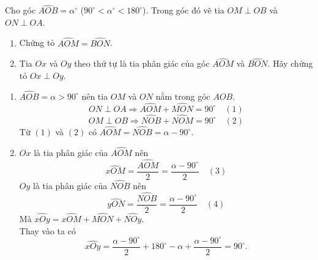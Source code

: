 \begin{bt}%
Cho góc $\widehat{AOB}=\alpha ^{\circ}$ ($90^{\circ}< \alpha^{\circ} <180^{\circ}$). Trong góc đó vẽ tia $OM \perp OB$ và $ON \perp OA$.
\begin{enumerate}
	\item Chứng tỏ $\widehat{AOM}=\widehat{BON}$.
	\item Tia $Ox$ và $Oy$ theo thứ tự là tia phân giác của góc $\widehat{AOM}$ và $\widehat{BON}$. Hãy chứng tỏ $Ox \perp Oy$.
\end{enumerate}
\loigiai
{ \begin{center}
	\end{center}
\begin{enumerate}
	\item $\widehat{AOB}=\alpha > 90^{\circ}$ nên tia $OM$ và $ON$ nằm trong góc $AOB$.\\
	$$ ON\perp OA \Rightarrow \widehat{AOM}+\widehat{MON}=90^{\circ} \quad (1) $$
	$$ OM\perp OB \Rightarrow \widehat{NOB}+\widehat{NOM}=90^{\circ} \quad (2) $$
	Từ $(1)$ và $(2)$ có $\widehat{AOM}=\widehat{NOB}=\alpha - 90^{\circ}.$
	\item $Ox$ là tia phân giác của $\widehat{AOM}$ nên 
	$$ \widehat{xOM}=\dfrac{\widehat{AOM}}{2}=\dfrac{\alpha - 90^{\circ}}{2} \quad (3) $$
	$Oy$ là tia phân giác của $\widehat{NOB}$ nên 
	$$ \widehat{yON}=\dfrac{\widehat{NOB}}{2}=\dfrac{\alpha - 90^{\circ}}{2} \quad (4) $$
	Mà $\widehat{xOy}=\widehat{xOM}+\widehat{MON}+\widehat{NOy}.$\\
	Thay vào ta có
	$$ \widehat{xOy}=\dfrac{\alpha -90^{\circ}}{2}+180^{\circ}-\alpha + \dfrac{\alpha-90^{\circ}}{2}=90^{\circ}. $$	
\end{enumerate}
}
\end{bt}

